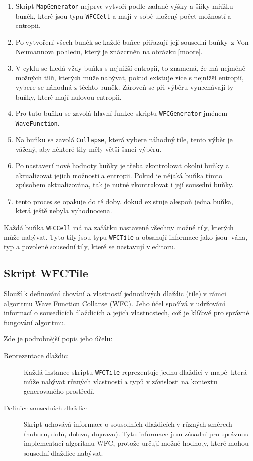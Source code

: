 \begin{enumerate}
	\item Skript \texttt{MapGenerator} nejprve vytvoří podle zadané výšky a šířky mřížku buněk, které jsou typu \texttt{WFCCell} a mají v sobě uložený počet možností a entropii.
	\item Po vytvoření všech buněk se každé buňce přiřazují její sousední buňky, z Von Neumannova pohledu, který je znázorněn na obrázku \ref{moore}.
	\item V cyklu se hledá vždy buňka s nejnižší entropií, to znamená, že má nejméně možných tilů, kterých může nabývat, pokud existuje více s nejnižší entropií, vybere se náhodná z těchto buněk. Zároveň se při výběru vynechávají ty buňky, které mají nulovou entropii.
	\item Pro tuto buňku se zavolá hlavní funkce skriptu \texttt{WFCGenerator} jménem \texttt{WaveFunction}. 
	\item Na buňku se zavolá \texttt{Collapse}, která vybere náhodný tile, tento výběr je vážený, aby některé tily měly větší šanci výběru.
	\item Po nastavení nové hodnoty buňky je třeba zkontrolovat okolní buňky a aktualizovat jejich možnosti a entropii. Pokud je nějaká buňka tímto způsobem aktualizována, tak je nutné zkontrolovat i její sousední buňky.
	\item tento proces se opakuje do té doby, dokud existuje alespoň jedna buňka, která ještě nebyla vyhodnocena.
\end{enumerate}

Každá buňka \texttt{WFCCell} má na začátku nastavené všechny možné tily, kterých může nabývat. Tyto tily jsou typu \texttt{WFCTile} a obsahují informace jako jsou, váha, typ a povolené sousední tily, které se nastavují v editoru.

\subsection{Skript WFCTile}

Slouží k definování chování a vlastností jednotlivých dlaždic (tile) v rámci algoritmu Wave Function Collapse (WFC). Jeho účel spočívá v udržování informací o sousedících dlaždicích a jejich vlastnostech, což je klíčové pro správné fungování algoritmu.

Zde je podrobnější popis jeho účelu:

\begin{description}
	\item [Reprezentace dlaždic:] Každá instance skriptu \texttt{WFCTile} reprezentuje jednu dlaždici v mapě, která může nabývat různých vlastností a typů v závislosti na kontextu generovaného prostředí.
	
	\item [Definice sousedních dlaždic:] Skript uchovává informace o sousedních dlaždicích v různých směrech (nahoru, dolů, doleva, doprava). Tyto informace jsou zásadní pro správnou implementaci algoritmu WFC, protože určují možné hodnoty, které mohou sousední dlaždice nabývat.
\end{description}

